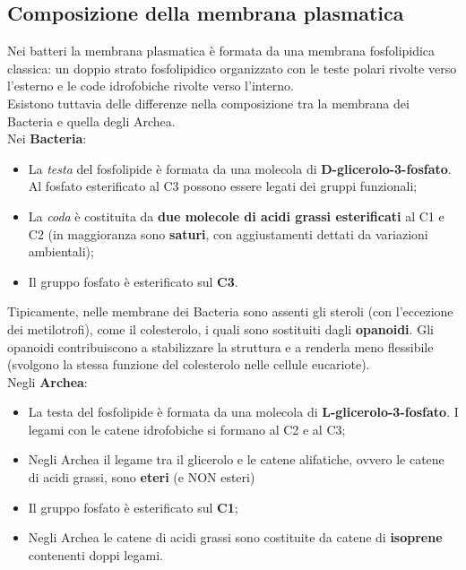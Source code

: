 \documentclass[11pt]{book}
\begin{document}
\subsection{Composizione della membrana plasmatica}
Nei batteri la membrana plasmatica è formata da una membrana fosfolipidica classica: un doppio strato fosfolipidico organizzato con le teste polari rivolte verso l'esterno e le code idrofobiche rivolte verso l'interno.\\

Esistono tuttavia delle differenze nella composizione tra la membrana dei Bacteria e quella degli Archea.\\

Nei \textbf{Bacteria}:
\begin{itemize}
\item La \emph{testa} del fosfolipide è formata da una molecola di \textbf{D-glicerolo-3-fosfato}. Al fosfato esterificato al C3 possono essere legati dei gruppi funzionali;
\item La \emph{coda} è costituita da \textbf{due molecole di acidi grassi esterificati} al C1 e C2 (in maggioranza sono \textbf{saturi}, con aggiustamenti dettati da variazioni ambientali);
\item Il gruppo fosfato è esterificato sul \textbf{C3}.
\end{itemize}

\vspace{1em}
Tipicamente, nelle membrane dei Bacteria sono assenti gli steroli (con l'eccezione dei metilotrofi), come il colesterolo, i quali sono sostituiti dagli \textbf{opanoidi}.
Gli opanoidi contribuiscono a stabilizzare la struttura e a renderla meno flessibile (svolgono la stessa funzione del colesterolo nelle cellule eucariote).\\

Negli \textbf{Archea}:
\begin{itemize}
\item La testa del fosfolipide è formata da una molecola di \textbf{L-glicerolo-3-fosfato}. I legami con le catene idrofobiche si formano al C2 e al C3;
\item Negli Archea il legame tra il glicerolo e le catene alifatiche, ovvero le catene di acidi grassi, sono \textbf{eteri} (e NON esteri)
\item Il gruppo fosfato è esterificato sul \textbf{C1};
\item Negli Archea le catene di acidi grassi sono costituite da catene di \textbf{isoprene} contenenti doppi legami.
\end{itemize}
\end{document}
